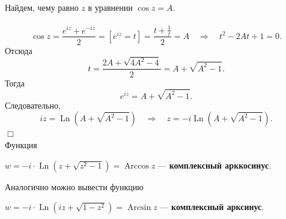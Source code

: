 \documentclass[a4paper, 12pt]{article}
\newenvironment{example} %
{\par\noindent{\textsc{\textbf{Пример}.}}} %
{\hfill$\scriptstyle\Box$} %
\newcommand{\Ln}{\operatorname{Ln}}
\newcommand{\Arccos}{\operatorname{Arccos}}
\newcommand{\Arcsin}{\operatorname{Arcsin}}
\begin{document}
\begin{example}
	Найдем, чему равно $z$ в уравнении $\cos z = A$.\\\\
	$$\cos z = \dfrac{e^{iz} + e^{-iz}}{2} = [e^{iz} = t] = \dfrac{t + \frac{1}{t}}{2} = A\quad\Rightarrow\quad t^2 - 2At + 1 = 0.$$
	Отсюда $$t = \dfrac{2A + \sqrt{4A^2 -4}}{2} = A + \sqrt{A^2 - 1}.$$
	Тогда $$e^{iz} = A + \sqrt{A^2 - 1}.$$
	Следовательно, $$iz = \Ln (A + \sqrt{A^2 - 1})\quad \Rightarrow\quad z = -i\Ln(A + \sqrt{A^2 - 1}).$$
\end{example}\\
Функция \begin{center}
	$w = -i\cdot\Ln(z + \sqrt{z^2 - 1}) = \Arccos z$ --- \textbf{комплексный арккосинус}.
\end{center} Аналогично можно вывести функцию \begin{center}
	$w = -i\cdot\Ln(iz + \sqrt{1 - z^2}) = \Arcsin z$ --- \textbf{комплексный арксинус}.
\end{center}
\end{document}
